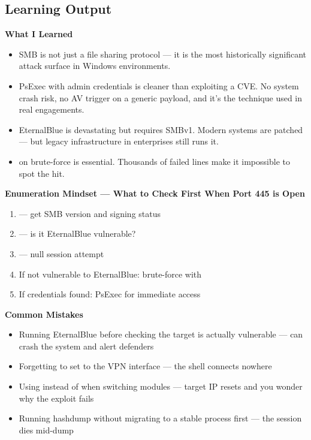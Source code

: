 \begin{notebox}[Null sessions]
\section{Learning Output}

\begin{takebox}
\textbf{What I Learned}
\begin{itemize}
  \item SMB is not just a file sharing protocol --- it is the most historically
        significant attack surface in Windows environments.
  \item PsExec with admin credentials is cleaner than exploiting a CVE. No
        system crash risk, no AV trigger on a generic payload, and it's the
        technique used in real engagements.
  \item EternalBlue is devastating but requires SMBv1. Modern systems are
        patched --- but legacy infrastructure in enterprises still runs it.
  \item {} on brute-force is essential. Thousands of failed
        lines make it impossible to spot the hit.
\end{itemize}

\textbf{Enumeration Mindset --- What to Check First When Port 445 is Open}
\begin{enumerate}
  \item {} --- get SMB version and signing status
  \item {} --- is it EternalBlue vulnerable?
  \item {} --- null session attempt
  \item If not vulnerable to EternalBlue: brute-force with 
  \item If credentials found: PsExec for immediate access
\end{enumerate}

\textbf{Common Mistakes}
\begin{itemize}
  \item Running EternalBlue before checking the target is actually vulnerable ---
        can crash the system and alert defenders
  \item Forgetting to set  to the VPN interface --- the shell connects
        nowhere
  \item Using  instead of  when switching modules --- target IP
        resets and you wonder why the exploit fails
  \item Running hashdump without migrating to a stable process first --- the session
        dies mid-dump
\end{itemize}


\end{takebox}
\end{notebox}

